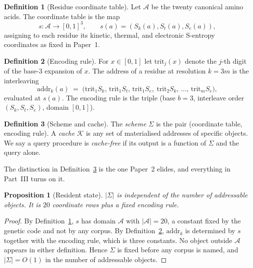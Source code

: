 \documentclass[11pt,twocolumn,a4paper]{article}
\newcommand{\Sk}{S_{k}}
\newcommand{\St}{S_{t}}
\newcommand{\Se}{S_{e}}
\newcommand{\Scoord}{s}
\newcommand{\addr}{\mathrm{addr}}
\newcommand{\trit}{\mathrm{trit}}
\newcommand{\Res}{\mathcal{A}}
\newcommand{\Sch}{\Sigma}
\newcommand{\Cache}{\mathcal{K}}
\theoremstyle{plain}
\newtheorem{proposition}[theorem]{Proposition}
\theoremstyle{definition}
\newtheorem{definition}{Definition}
\theoremstyle{remark}
\begin{document}
\begin{definition}[Residue coordinate table]
\label{def:table}
Let $\Res$ be the twenty canonical amino acids. The coordinate table is the
map
\[
  \Scoord : \Res \longrightarrow [0,1]^{3},
  \qquad
  \Scoord(a) = (\Sk(a), \St(a), \Se(a)),
\]
assigning to each residue its kinetic, thermal, and electronic S-entropy
coordinates as fixed in Paper~1.
\end{definition}

\begin{definition}[Encoding rule]
\label{def:encoding}
For $x \in [0,1]$ let $\trit_{j}(x)$ denote the $j$-th digit of the base-$3$
expansion of $x$. The address of a residue at resolution $k = 3m$ is the
interleaving
\[
  \addr_{k}(a) \;=\;
  \bigl(\trit_{1}\Sk,\, \trit_{1}\St,\, \trit_{1}\Se,\;
        \trit_{2}\Sk,\, \dots,\, \trit_{m}\Se\bigr),
\]
evaluated at $\Scoord(a)$. The encoding rule is the triple (base $b=3$,
interleave order $(\Sk,\St,\Se)$, domain $[0,1]$).
\end{definition}

\begin{definition}[Scheme and cache]
\label{def:scheme-cache}
The \emph{scheme} $\Sch$ is the pair (coordinate table, encoding rule). A
\emph{cache} $\Cache$ is any set of materialised addresses of specific
objects. We say a query procedure is \emph{cache-free} if its output is a
function of $\Sch$ and the query alone.
\end{definition}

The distinction in Definition~\ref{def:scheme-cache} is the one Paper~2
elides, and everything in Part~III turns on it.

\begin{proposition}[Resident state]
\label{prop:resident}
$|\Sch|$ is independent of the number of addressable objects. It is
$20$ coordinate rows plus a fixed encoding rule.
\end{proposition}

\begin{proof}
By Definition~\ref{def:table}, $\Scoord$ has domain $\Res$ with
$|\Res| = 20$, a constant fixed by the genetic code and not by any corpus.
By Definition~\ref{def:encoding}, $\addr_{k}$ is determined by $\Scoord$
together with the encoding rule, which is three constants. No object
outside $\Res$ appears in either definition. Hence $\Sch$ is fixed before
any corpus is named, and $|\Sch| = O(1)$ in the number of addressable
objects.
\end{proof}
\end{document}
